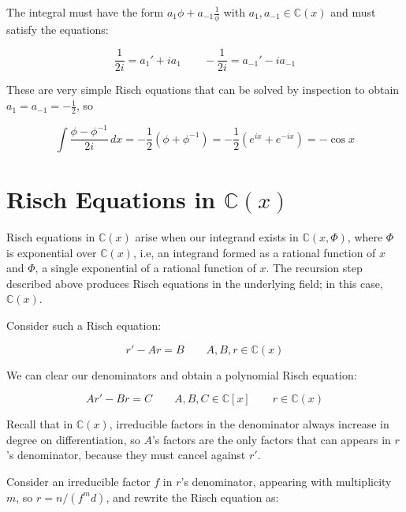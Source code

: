 The integral must have the form $a_1 \phi + a_{-1} \frac{1}{\phi}$
with $a_1, a_{-1} \in {\mathbb C}(x)$ and must satisfy the equations:

$$\frac{1}{2i} = a_1' + i a_1 \qquad - \frac{1}{2i} = a_{-1}' - i a_{-1}$$ 

These are very simple Risch equations that can be solved by inspection
to obtain $a_1 = a_{-1} = -\frac{1}{2}$, so

$$\int \frac{\phi - \phi^{-1}}{2i} \,dx = -\frac{1}{2}(\phi + \phi^{-1})
 = -\frac{1}{2}(e^{ix} + e^{-ix}) = -\cos x$$

\endexample

\vfill\eject
\section{Risch Equations in ${\mathbb C}(x)$}

Risch equations in ${\mathbb C}(x)$ arise when our integrand exists in
${\mathbb C}(x,\Phi)$, where $\Phi$ is exponential over ${\mathbb
C}(x)$, i.e, an integrand formed as a rational function of $x$ and $\Phi$, a
single exponential of a rational function of $x$.  The recursion step
described above produces Risch equations in the underlying field;
in this case, ${\mathbb C}(x)$.

Consider such a Risch equation:

$$r' - A r = B \qquad A,B,r \in {\mathbb C}(x)$$

We can clear our denominators and obtain a polynomial Risch equation:

$$A r' - B r = C \qquad A,B,C \in {\mathbb C}[x] \qquad r \in {\mathbb C}(x)$$

Recall that in ${\mathbb C}(x)$, irreducible factors in the
denominator always increase in degree on differentiation, so $A$'s
factors are the only factors that can appears in $r$'s denominator,
because they must cancel against $r'$.

Consider an irreducible factor $f$ in $r$'s denominator, appearing with
multiplicity $m$, so $r = n/(f^m d)$, and rewrite the Risch equation as:

\begin{comment}
$$A f^a r' - B f^b r = C f^c$$

$$A f^a \frac{n' f^m d - n(m f^{m-1} d + f^m d')}{f^{2m} d^2} - B f^b \frac{n}{f^m d} = C f^c$$

$$A f^a \frac{n' f d - n(m d + f d')}{f^{m+1} d^2} - B f^b \frac{n}{f^m d} = C f^c$$

$$A f^a (n' f d - n(m d + f d')) - B f^{b+1} n d = C d^2 f^{c+m+1} $$

$$A f^a (n' f d - m n d - f n d') - B f^{b+1} n d = C d^2 f^{c+m+1} $$

$$A n' d f^{a+1} - m A n d f^a - A n d' f^{a+1} - B n d f^{b+1} = C d^2 f^{c+m+1} $$
\end{comment}

